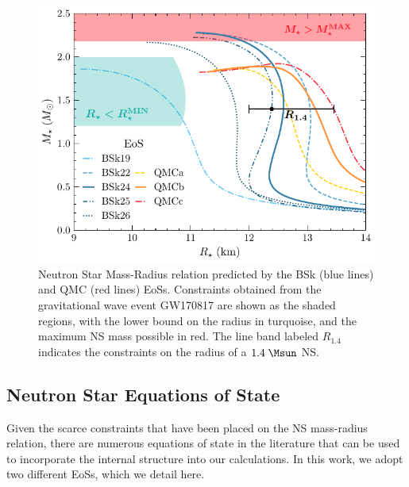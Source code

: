 \begin{figure}[t!bp]
    \centering
    \includegraphics{NS_mass_radius.pdf}
    \caption{Neutron Star Mass-Radius relation predicted by the BSk (blue lines) and QMC (red lines) EoSs. Constraints obtained from the gravitational wave event GW170817 are shown as the shaded regions, with the lower bound on the radius in turquoise, and the maximum NS mass possible in red. The line band labeled $R_{1.4}$ indicates the constraints on the radius of a $1.4\;\Msun$ NS.}
    \label{ch2:fig:NS_mass_rad}
\end{figure}



\subsection{Neutron Star Equations of State}
\label{ch2:subsec:NS_EoS}

Given the scarce constraints that have been placed on the NS mass-radius relation, there are numerous equations of state in the literature that can be used to incorporate the internal structure into our calculations. In this work, we adopt two different EoSs, which we detail here. 


